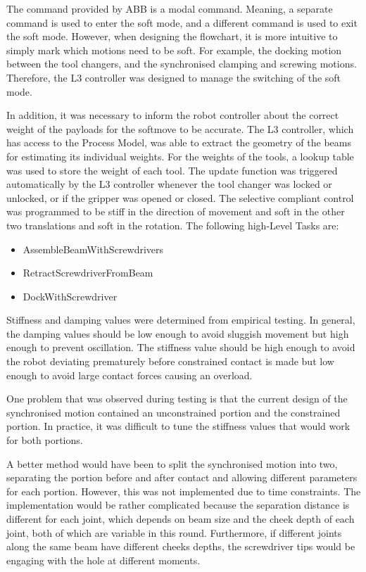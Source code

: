 The command provided by ABB is a modal command. Meaning, a separate command is used to enter the soft mode, and a different command is used to exit the soft mode. However, when designing the flowchart, it is more intuitive to simply mark which motions need to be soft. For example, the docking motion between the tool changers, and the synchronised clamping and screwing motions. Therefore, the L3 controller was designed to manage the switching of the soft mode. 

In addition, it was necessary to inform the robot controller about the correct weight of the payloads for the softmove to be accurate. The L3 controller, which has access to the Process Model, was able to extract the geometry of the beams for estimating its individual weights. For the weights of the tools, a lookup table was used to store the weight of each tool. The update function was triggered automatically by the L3 controller whenever the tool changer was locked or unlocked, or if the gripper was opened or closed. 
The selective compliant control was programmed to be stiff in the direction of movement and soft in the other two translations and soft in the rotation. The following high-Level Tasks are: 
\begin{itemize}
    \item AssembleBeamWithScrewdrivers
    \item RetractScrewdriverFromBeam
    \item DockWithScrewdriver
\end{itemize}

Stiffness and damping values were determined from empirical testing. In general, the damping values should be low enough to avoid sluggish movement but high enough to prevent oscillation. The stiffness value should be high enough to avoid the robot deviating prematurely before constrained contact is made but low enough to avoid large contact forces causing an overload. 

One problem that was observed during testing is that the current design of the synchronised motion contained an unconstrained portion and the constrained portion. In practice, it was difficult to tune the stiffness values that would work for both portions. 

A better method would have been to split the synchronised motion into two, separating the portion before and after contact and allowing different parameters for each portion. However, this was not implemented due to time constraints. The implementation would be rather complicated because the separation distance is different for each joint, which depends on beam size and the cheek depth of each joint, both of which are variable in this round. Furthermore, if different joints along the same beam have different cheeks depths, the screwdriver tips would be engaging with the hole at different moments. 

